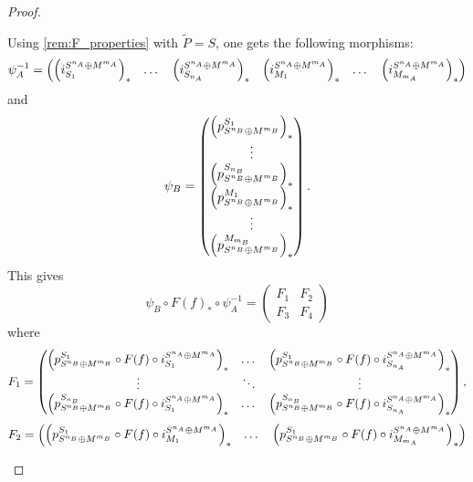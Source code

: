 \begin{proof}
\begin{enumerate}
{            Using \autoref{rem:F_properties} with \( \tilde{P} = S \), one gets the following morphisms:
            \[
                \psi_A^{-1} = \begin{pmatrix}
                    \left(  i_{S_1}^{S^{n_A} \oplus M^{m_A}}  \right)_* & \dots & \left(  i_{S_{n_A}}^{S^{n_A} \oplus M^{m_A}}  \right)_* & \left(  i_{M_1}^{S^{n_A} \oplus M^{m_A}}  \right)_* & \dots & \left(  i_{M_{m_A}}^{S^{n_A} \oplus M^{m_A}}  \right)_*
                \end{pmatrix}
            \]
            and
            \[
                \psi_B = \begin{pmatrix}
                    \left(  p_{S^{n_B} \oplus M^{m_B}}^{S_1}  \right)_* \\
                    \vdots \\
                    \left(  p_{S^{n_B} \oplus M^{m_B}}^{S_{n_B}}  \right)_* \\
                    \left(  p_{S^{n_B} \oplus M^{m_B}}^{M_1}  \right)_* \\
                    \vdots \\
                    \left(  p_{S^{n_B} \oplus M^{m_B}}^{M_{m_B}}  \right)_*
                \end{pmatrix}.
            \]
            This gives
            \[
                \psi_B \circ F(f)_* \circ \psi_A^{-1} =
                \begin{pmatrix}
                    F_1 & F_2 \\
                    F_3 & F_4
                \end{pmatrix}
            \]
            where
            \[
                F_1 = \begin{pmatrix}
                    \left(  p_{S^{n_B} \oplus M^{m_B}}^{S_1} \circ F(f) \circ i_{S_1}^{S^{n_A} \oplus M^{m_A}}  \right)_* & \dots & \left(  p_{S^{n_B} \oplus M^{m_B}}^{S_1} \circ F(f) \circ i_{S_{n_A}}^{S^{n_A} \oplus M^{m_A}}  \right)_* \\
                    \vdots & \ddots & \vdots \\
                    \left(  p_{S^{n_B} \oplus M^{m_B}}^{S_{n_B}} \circ F(f) \circ i_{S_1}^{S^{n_A} \oplus M^{m_A}}  \right)_* & \dots & \left(  p_{S^{n_B} \oplus M^{m_B}}^{S_{n_B}} \circ F(f) \circ i_{S_{n_A}}^{S^{n_A} \oplus M^{m_A}}  \right)_* \\
                \end{pmatrix},
            \]
            \[
                F_2 = \begin{pmatrix}
                    \left(  p_{S^{n_B} \oplus M^{m_B}}^{S_1} \circ F(f) \circ i_{M_1}^{S^{n_A} \oplus M^{m_A}}  \right)_* & \dots & \left(  p_{S^{n_B} \oplus M^{m_B}}^{S_1} \circ F(f) \circ i_{M_{m_A}}^{S^{n_A} \oplus M^{m_A}}  \right)_* \\

\end{pmatrix}\]}
\end{enumerate}
\end{proof}
